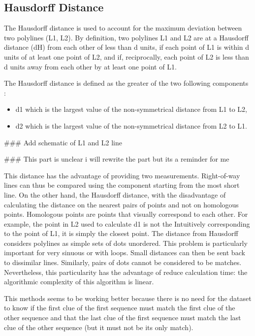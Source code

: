 \documentclass{article}
\begin{document}
\subsection{Hausdorff Distance }
The Hausdorff distance is used to account for the maximum deviation between two polylines (L1, L2). By definition, two polylines L1 and L2 are at a Hausdorff distance (dH) from each other of less than d units, if each point of L1 is within d units of at least one point of L2, and if, reciprocally, each point of L2 is less than d units away from each other by at least one
point of L1.

The Hausdorff distance is defined as the greater of the two following components :

\begin{itemize}
    \item d1 which is the largest value of the non-symmetrical distance from L1 to L2,
    \item d2 which is the largest value of the non-symmetrical distance from L2 to L1.
\end{itemize}

\#\#\# Add schematic of L1 and L2 line


\#\#\# This part is unclear i will rewrite the part but its a reminder for me




This distance has the advantage of providing two measurements. Right-of-way lines can thus be compared using the component starting from the most short line. On the other hand, the Hausdorff distance, with the disadvantage of calculating the
distance on the nearest pairs of points and not on homologous points. Homologous points are points that visually correspond to each other. For example, the point in L2 used to calculate d1 is not the Intuitively corresponding to the point of L1, it is simply the closest point. The distance from Hausdorff considers polylines as simple sets of dots unordered. This problem is particularly important for very sinuous or with loops. Small distances can then be sent back to dissimilar lines. Similarly, pairs of dots cannot be considered to be matches. Nevertheless, this particularity has the advantage of
reduce calculation time: the algorithmic complexity of this algorithm is linear. 


This methods seems to be working better because there is no need for the dataset to know if the first clue of the first sequence must match the first clue of the other sequence and that
the last clue of the first sequence must match the last clue of the other sequence (but it must not be its only match).
\end{document}
